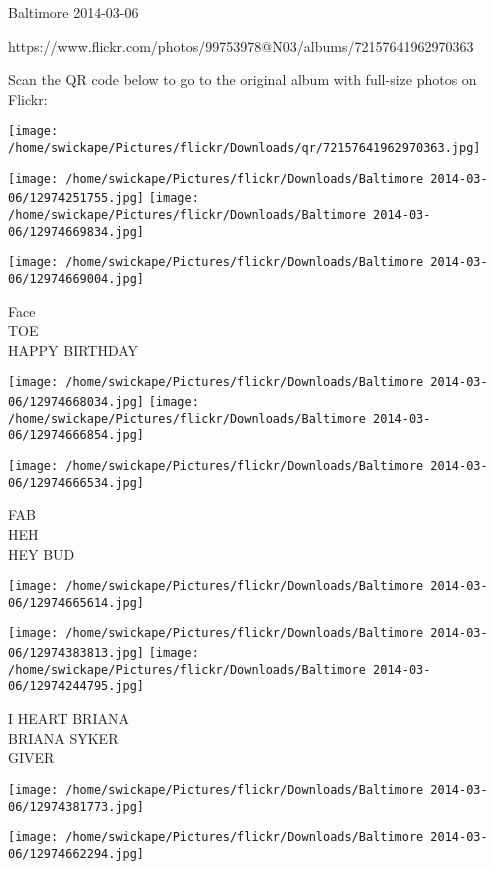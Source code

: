 \documentclass[10pt,letterpaper]{article}
\begin{document}
Baltimore 2014-03-06

https://www.flickr.com/photos/99753978@N03/albums/72157641962970363

Scan the QR code below to go to the original album with full-size photos on Flickr:

\texttt{[image: /home/swickape/Pictures/flickr/Downloads/qr/72157641962970363.jpg]}
\pagebreak

\texttt{[image: /home/swickape/Pictures/flickr/Downloads/Baltimore 2014-03-06/12974251755.jpg]}
\texttt{[image: /home/swickape/Pictures/flickr/Downloads/Baltimore 2014-03-06/12974669834.jpg]}

\vspace{0.25in}
\texttt{[image: /home/swickape/Pictures/flickr/Downloads/Baltimore 2014-03-06/12974669004.jpg]}

Face\\
TOE\\
HAPPY BIRTHDAY\\
\pagebreak

\texttt{[image: /home/swickape/Pictures/flickr/Downloads/Baltimore 2014-03-06/12974668034.jpg]}
\texttt{[image: /home/swickape/Pictures/flickr/Downloads/Baltimore 2014-03-06/12974666854.jpg]}

\texttt{[image: /home/swickape/Pictures/flickr/Downloads/Baltimore 2014-03-06/12974666534.jpg]}

FAB\\
HEH\\
HEY BUD\\
\pagebreak

\texttt{[image: /home/swickape/Pictures/flickr/Downloads/Baltimore 2014-03-06/12974665614.jpg]}

\vspace{0.25in}
\texttt{[image: /home/swickape/Pictures/flickr/Downloads/Baltimore 2014-03-06/12974383813.jpg]}
\texttt{[image: /home/swickape/Pictures/flickr/Downloads/Baltimore 2014-03-06/12974244795.jpg]}

I HEART BRIANA\\
BRIANA SYKER\\
GIVER\\
\pagebreak

\texttt{[image: /home/swickape/Pictures/flickr/Downloads/Baltimore 2014-03-06/12974381773.jpg]}

\vspace{0.25in}
\texttt{[image: /home/swickape/Pictures/flickr/Downloads/Baltimore 2014-03-06/12974662294.jpg]}
\end{document}

